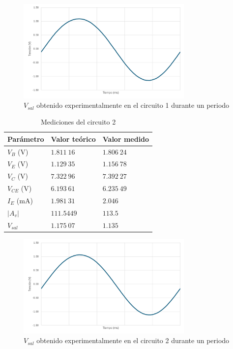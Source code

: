 \documentclass[journal]{IEEEtran}
\begin{document}
\begin{figure}[H]
        \centering
        \includegraphics[width=3.4in]{OutC1.png}
        \caption{$V_{sal}$ obtenido experimentalmente en el circuito 1 durante un periodo}
        \label{fig:SignalExperimental_0222}
\end{figure}
    
\begin{table}[H]
        \renewcommand{\arraystretch}{1.5}
        \caption{Mediciones del circuito 2}
        \centering
        \begin{tabular}{ >{\centering\arraybackslash}m{2.5cm} >{\centering\arraybackslash}m{2.5cm} >{\centering\arraybackslash}m{2.5cm} }
                \hline
            Parámetro & Valor teórico & Valor medido\\ 
            \hline
            $V_B$ ($\mathrm{V}$) & $1.811~16$  & $1.806~24$  \\ 
            $V_E$ ($\mathrm{V}$) & $1.129~35$  & $1.156~78$  \\
            $V_C$ ($\mathrm{V}$) & $7.322~96$  & $7.392~27$  \\
            $V_{CE}$ ($\mathrm{V}$) & $6.193~61$  & $6.235~49$  \\
            $I_E$ ($\mathrm{mA}$) & $1.981~31$  & $2.046$ \\ 
            $|A_v|$  & $111.5449$ & $113.5$  \\
            $V_{sal}$ & $1.175~07$  & $1.135$ \\
            \hline
        \end{tabular}
        \label{tabla6}
    \end{table}

\begin{figure}[H]
        \centering
        \includegraphics[width=3.4in]{OutC2.png}
        \caption{$V_{sal}$ obtenido experimentalmente en el circuito 2 durante un periodo}
        \label{fig:SignalExperimental_02}
\end{figure}
\end{document}
